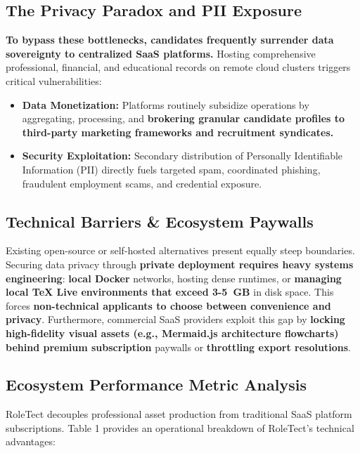 \documentclass[10pt,a4paper]{article}
\begin{document}
\subsection{The Privacy Paradox and PII Exposure}
\textbf{To bypass these bottlenecks, candidates frequently surrender data sovereignty to centralized SaaS platforms.} Hosting comprehensive professional, financial, and educational records on remote cloud clusters triggers critical vulnerabilities:
\begin{itemize}
    \item \textbf{Data Monetization:} Platforms routinely subsidize operations by aggregating, processing, and \textbf{brokering granular candidate profiles to third-party marketing frameworks and recruitment syndicates.}
    \item \textbf{Security Exploitation:} Secondary distribution of Personally Identifiable Information (PII) directly fuels targeted spam, coordinated phishing, fraudulent employment scams, and credential exposure.
\end{itemize}

\subsection{Technical Barriers \& Ecosystem Paywalls}
Existing open-source or self-hosted alternatives present equally steep boundaries. Securing data privacy through \textbf{private deployment requires heavy systems engineering}: \textbf{local Docker} networks, {hosting dense runtimes}, or \textbf{managing local TeX Live environments that exceed 3-5~GB} in disk space. This forces \textbf{non-technical applicants to choose between convenience and privacy}. Furthermore, commercial SaaS providers exploit this gap by \textbf{locking high-fidelity visual assets (e.g., Mermaid.js architecture flowcharts) behind premium subscription} paywalls or \textbf{throttling export resolutions}.


\subsection{Ecosystem Performance Metric Analysis}
RoleTect decouples professional asset production from traditional SaaS platform subscriptions. Table 1 provides an operational breakdown of RoleTect's technical advantages:
\end{document}

